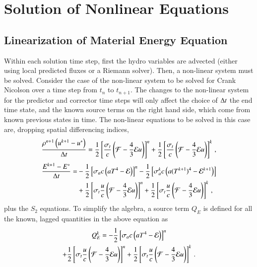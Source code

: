 \section{Solution of Nonlinear Equations}
\subsection{Linearization of Material Energy Equation}

Within each solution time step, first the hydro variables are advected (either
using local predicted fluxes or a Riemann solver).  Then, a non-linear system
must be solved.  Consider the case of the non-linear system to be solved for
Crank Nicolson over a time step from $t_n$ to $t_{n+1}$.  The changes to the
non-linear system for the predictor and corrector time steps will only affect
the choice of $\Delta t$ the end time state, and the known source terms on the right
hand side, which come from known previous states in time.  The non-linear
equations to be solved in this case are, dropping spatial differencing indices,
\begin{equation}
  \frac{\rho^{n+1}\left(u^{k+1}-u^*\right)}{\Delta t} = 
   \frac{1}{2}\left[\frac{\sigma_{t}}{c}\left(\mathcal{F}-\frac{4}{3}\mathcal{E} u\right)\right]^n
  +\frac{1}{2}\left[\frac{\sigma_{t}}{c}\left(\mathcal{F}-\frac{4}{3}\mathcal{E} u\right)\right]^k
  \, ,
\label{eq:vel_update}
\end{equation}
\begin{equation}\begin{split}
  \frac{E^{k+1}-E^*}{\Delta t} = &
  -\frac{1}{2}\left[\sigma_{a} c\left(aT^4 - \mathcal{E}\right)\right]^n
  -\frac{1}{2}\left[\sigma_{a}^k c\left(a(T^{k+1})^4 - \mathcal{E}^{k+1}\right)\right]\\
  &+\frac{1}{2}\left[\sigma_{t}\frac{u}{c}\left(\mathcal{F}-\frac{4}{3}\mathcal{E} u\right)\right]^n
   +\frac{1}{2}\left[\sigma_{t}\frac{u}{c}\left(\mathcal{F}-\frac{4}{3}\mathcal{E} u\right)\right]^k
  \, ,
\label{eq:mat}
\end{split}\end{equation}
plus the $S_2$ equations.  To simplify the algebra, a source term $Q_E$ is
defined for all the known, lagged quantities in the above equation as
\begin{multline}
   Q_E^{k} = -\frac{1}{2}\left[\sigma_a c\left( aT^4 - \mathcal{E}\right)\right]^n\\
   +\frac{1}{2}\left[\sigma_t \frac{u}{c} \left( \mathcal{F} - \frac{4}{3} \mathcal{E} u \right)\right]^n + \frac{1}{2}\left[\sigma_t \frac{u}{c} \left( \mathcal{F} - \frac{4}{3} \mathcal{E} u \right)\right]^k \, .
\end{multline}
